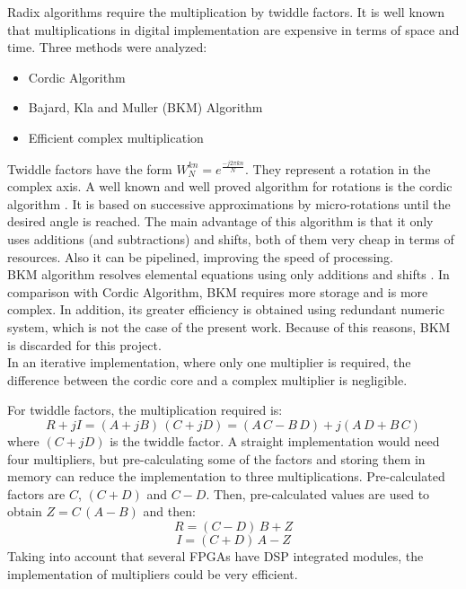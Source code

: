 \documentclass[conference]{IEEEtran}
\begin{document}
Radix algorithms require the multiplication by twiddle factors. It is well known that multiplications in digital implementation are expensive  
in terms of space and time. Three methods were analyzed:
\begin{itemize}
  \item Cordic Algorithm
  \item Bajard, Kla and Muller (BKM) Algorithm
  \item Efficient complex multiplication
\end{itemize}

Twiddle factors have the form $W_N^{kn}=e^{\frac{-j2\pi kn}{N}}$. They represent a rotation in the complex axis. A well known and well proved 
algorithm for rotations is the cordic algorithm \cite{Volder}. It is based on successive approximations by micro-rotations until the desired angle is reached.
The main advantage of this algorithm is that it only uses additions (and subtractions) and shifts, both of them very cheap in terms
of resources. Also it can be pipelined, improving the speed of processing.\\

BKM algorithm resolves elemental equations using only additions and shifts \cite{BKM}. 
In comparison with Cordic Algorithm, BKM requires more storage and is more complex. In addition, its greater efficiency is obtained using 
redundant numeric system, which is not the case of the present work. Because of this reasons, BKM is discarded for this project.\\

In an iterative implementation, where only one multiplier is required, the difference between the cordic core and a complex multiplier is negligible.

For twiddle factors, the multiplication required is:
\begin{equation}
R+jI = (A+jB) \, (C+jD) = (A \, C-B \, D) + j(A\, D+B \, C)
\label{eq:prodcomp4}
\end{equation}
where $(C+jD)$ is the twiddle factor. A straight implementation would need four multipliers, but pre-calculating some of the factors and 
storing them in memory can reduce the implementation to three multiplications.
Pre-calculated factors are $C$, $(C+D)$ and $C-D$. Then, pre-calculated values 
are used to obtain $Z = C \, (A-B)$ and then:
\begin{equation}
R = (C-D) \, B + Z
\label{eq:prodcompR}
\end{equation}
\begin{equation}
I = (C+D) \, A - Z
\label{eq:prodcompI}
\end{equation}
 Taking into account that several FPGAs have DSP integrated modules, the implementation of multipliers could be very efficient.\\
\end{document}
